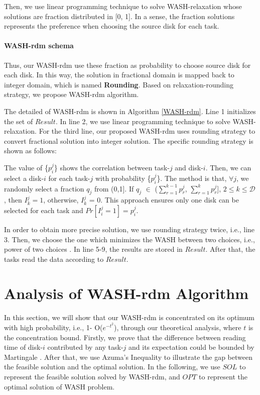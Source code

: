 \documentclass[conference]{IEEEtran}
\begin{document}
Then, we use linear programming technique to solve WASH-relaxation whose solutions are fraction distributed in [0, 1]. In a sense, the fraction solutions represents the preference when choosing the source disk for each task. 
 \paragraph{\textbf{WASH-rdm schema}} 
Thus, our WASH-rdm use these fraction as probability to choose source disk for each disk. In this way, the solution in fractional domain is mapped back to integer domain, which is named \textbf{Rounding}. 
Based on relaxation-rounding strategy, we propose WASH-rdm algorithm. 

The detailed of WASH-rdm is shown in Algorithm \ref{WASH-rdm}. Line 1 initializes the set of $Result$. In line 2, we use linear programming technique to solve WASH-relaxation. For the third line, our proposed WASH-rdm uses rounding strategy to convert fractional solution into integer solution. The specific rounding strategy is shown as follows:
 
The value of \{$p_i^j$\}  shows the correlation between task-$j$ and disk-$i$. Then, we can select a disk-$i$ for each task-$j$ with probability \{$p_i^j$\}. The method is that, $\forall j$, we randomly select a fraction $q_j$ from (0,1]. If $q_j$ $\in$ ($\sum\nolimits_{r = 1}^{k-1} p_{r}^{j}$,  $\sum\nolimits_{r = 1}^{k} p_{r}^{j}$], $2 \leq k \leq \mathcal{D} $, then $I_k^j = 1$, otherwise, $I_k^j$ = 0. This approach ensures only one disk can be selected for each task and $Pr[I_i^j = 1] = p_i^j$.

In order to obtain more precise solution, we use rounding strategy twice, i.e., line 3. Then, we choose the one which minimizes the WASH between two choices, i.e., power of two choices \cite{b43}. In line 5-9, the results are stored in $Result$. After that, the tasks read the data according to $Result$. 

\section{Analysis of WASH-rdm Algorithm}\label{Analysis}

In this section, we will show that our WASH-rdm is concentrated on its optimum with high probability, i.e., 1- O($e^{-t^2}$), through our theoretical analysis, where $t$ is the concentration bound. Firstly, we prove that the difference between reading time of disk-$i$ contributed by any task-$j$ and its expectation could be bounded by Martingale \cite{b12}. After that, we use Azuma's Inequality to illustrate the gap between the feasible solution and the optimal solution. In the following, we use $SOL$ to represent the feasible solution solved by WASH-rdm, and $OPT$ to represent the optimal solution of WASH problem.
\end{document}
